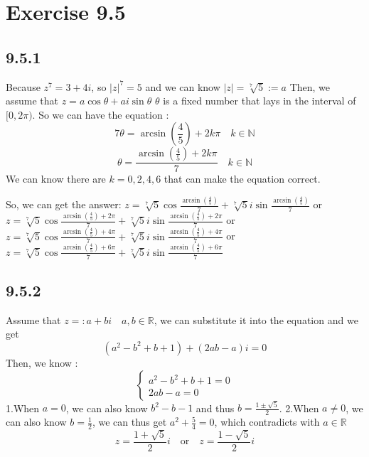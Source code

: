 \documentclass[11pt,twoside,a4paper]{article}
\begin{document}
\section{Exercise 9.5}
\subsection{9.5.1}
Because $z^7=3+4i$, so $|z|^7=5$ and we can know $|z|=\sqrt[7]{5}:=a $
Then, we assume that\newline
$z=a\cos \theta +a i \sin \theta $ $\theta $ is a fixed number that lays in
the interval of $[0,2\pi)$. So we can have the equation :
$$7\theta =\arcsin (\frac{4}{5})+2k\pi \quad k\in \mathbb{N}$$
$$\theta =\frac{\arcsin (\frac{4}{5})+2k\pi}{7} \quad k\in \mathbb{N}$$
We can know there are $k=0,2,4,6$ that can make the equation
correct.

So, we can get the answer: 
\newline
$\displaystyle z=\sqrt[7]{5}\cos \frac{\arcsin (\frac{4}{5})}{7} +\sqrt[7]{5} i \sin \frac{\arcsin (\frac{4}{5})}{7}$
\newline
or 
$\displaystyle z=\sqrt[7]{5}\cos \frac{\arcsin (\frac{4}{5})+2\pi}{7} +\sqrt[7]{5} i \sin \frac{\arcsin (\frac{4}{5})+2\pi}{7}$
\newline
or 
$\displaystyle z=\sqrt[7]{5}\cos \frac{\arcsin (\frac{4}{5})+4\pi}{7} +\sqrt[7]{5} i \sin \frac{\arcsin (\frac{4}{5})+4\pi}{7}$
\newline
or 
$\displaystyle z=\sqrt[7]{5}\cos \frac{\arcsin (\frac{4}{5})+6\pi}{7} +\sqrt[7]{5} i \sin \frac{\arcsin (\frac{4}{5})+6\pi}{7}$
\subsection{9.5.2}
Assume that $z=:a+bi\quad a,b\in \mathbb{R}$, we can substitute it into
the equation and we get 
$$(a^2-b^2+b+1)+(2ab-a)i=0$$
Then, we know :
$$
\begin{cases}
    a^2-b^2+b+1=0\\
    2ab-a=0
\end{cases}
$$
1.When $a=0$, we can also know $b^2-b-1$ and thus $\displaystyle
b=\frac{1\pm \sqrt{5}}{2}$.
\newline
2.When $a\neq 0$, we can also know $\displaystyle b=\frac{1}{2}$, we can thus get
 $\displaystyle a^2+\frac{5}{4}=0$, which contradicts with $a \in \mathbb{R}$
\newline
$$z=\frac{1+\sqrt{5}}{2} i\quad \text{or} \quad z=\frac{1-\sqrt{5}}{2}i$$
\end{document}
